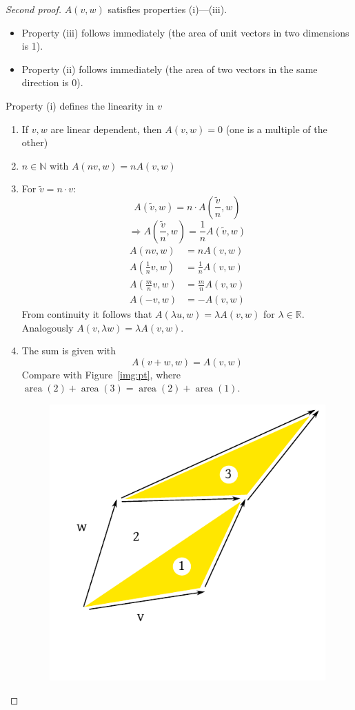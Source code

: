 \documentclass[a4paper,landscape,twocolumn]{article}
\theoremstyle{definition}
\begin{document}
\begin{proof}[Second proof]
  $A(v,w)$ satisfies properties (i)---(iii).
  \begin{itemize}
    \item Property (iii) follows immediately (the area of unit vectors in two dimensions is 1).
    \item Property (ii) follows immediately (the area of two vectors in the same direction is 0).
  \end{itemize}
  Property (i) defines the linearity in $v$
  \begin{enumerate}
    \item If $v,w$ are linear dependent, then $A(v,w) = 0$ (one is a multiple of the other)
    \item $n\in \mathbb N$ with $A(nv,w) = nA(v,w)$
    \item For $\tilde{v} = n \cdot v$:
      \[ A(\tilde{v}, w) = n \cdot A(\frac{\tilde{v}}{n}, w) \]
      \[ \Rightarrow A(\frac{\tilde{v}}{n}, w) = \frac1n A(\tilde{v}, w) \]
      \begin{align*}
        A(nv,w) &= n A(v,w) \\
        A(\frac1n v, w) &= \frac1n A(v,w) \\
        A(\frac mn v, w) &= \frac mn A(v,w) \\
        A(-v,w) &= -A(v,w)
      \end{align*}
      From continuity it follows that $A(\lambda u, w) = \lambda A(v, w)$ for $\lambda \in \mathbb R$.
      Analogously $A(v, \lambda w) = \lambda A(v, w)$.
    \item The sum is given with
      \[ A(v + w, w) = A(v, w) \]
      Compare with Figure~\ref{img:pt}, where $\operatorname{area}(2) + \operatorname{area}(3) = \operatorname{area}(2) + \operatorname{area}(1)$.
      \begin{figure}[!h]
        \begin{center}
          \includegraphics{img/parallelogram-translation.pdf}

\end{center}
\end{figure}
\end{enumerate}
\end{proof}
\end{document}
